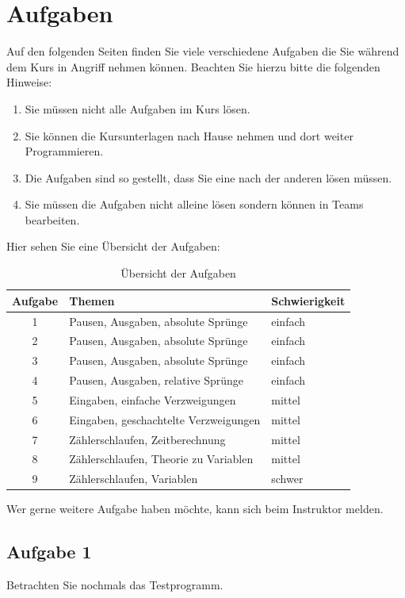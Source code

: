 \section{Aufgaben}
Auf den folgenden Seiten finden Sie viele verschiedene Aufgaben die
Sie während dem Kurs in Angriff nehmen können. Beachten Sie hierzu 
bitte die folgenden Hinweise:

\begin{enumerate}
\item Sie müssen nicht alle Aufgaben im Kurs lösen.
\item Sie können die Kursunterlagen nach Hause nehmen und dort weiter Programmieren. 
\item Die Aufgaben sind so gestellt, dass Sie eine nach der anderen lösen 
müssen. 
\item Sie müssen die Aufgaben nicht alleine lösen sondern können in Teams bearbeiten.
\end{enumerate}

\noindent
Hier sehen Sie eine Übersicht der Aufgaben:

\begin{table}[h!]
\centering
\begin{tabular}{cll}
\textbf{Aufgabe} & \textbf{Themen} & \textbf{Schwierigkeit} \\ 
\hline
1 & Pausen, Ausgaben, absolute Sprünge & einfach \\ 
2 & Pausen, Ausgaben, absolute Sprünge & einfach \\ 
3 & Pausen, Ausgaben, absolute Sprünge & einfach \\ 
4 & Pausen, Ausgaben, relative Sprünge & einfach \\ 
5 & Eingaben, einfache Verzweigungen & mittel \\ 
6 & Eingaben, geschachtelte Verzweigungen & mittel \\ 
7 & Zählerschlaufen, Zeitberechnung & mittel  \\ 
8 & Zählerschlaufen, Theorie zu Variablen & mittel \\ 
9 & Zählerschlaufen, Variablen & schwer \\ 
\end{tabular} 
\caption{Übersicht der Aufgaben}
\end{table}

\noindent
Wer gerne weitere Aufgabe haben möchte, kann sich beim Instruktor melden.

\newpage
\subsection{Aufgabe 1}
Betrachten Sie nochmals das Testprogramm.


